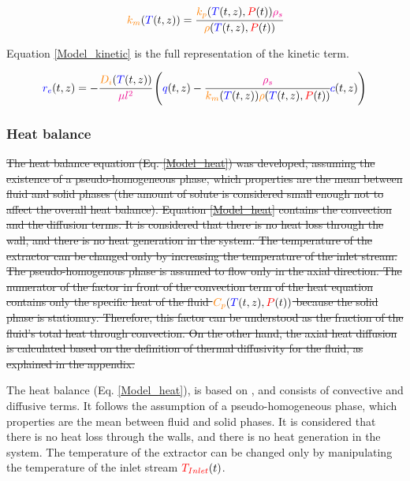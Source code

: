 \documentclass[../Parameter_fitting.tex]{subfiles}
\begin{document}
			{\footnotesize
				\begin{align}
					{\color{orange}k_m}({\color{blue}T}(t,z)) = \cfrac{{\color{orange}k_p}({\color{blue}T}(t,z),{\color{red}P}(t)) {\color{magenta}\rho_s}}{{\color{orange}\rho}({\color{blue}T}(t,z),{\color{red}P}(t))}
			\end{align} }
			
			Equation \ref{Model_kinetic} is the full representation of the kinetic term.
			
			{\footnotesize
				\begin{align}
					\label{Model_kinetic}
					{\color{blue}r_e}(t,z) = -\cfrac{{\color{orange}D_i}({\color{blue}T}(t,z))}{{\color{magenta} \mu l^2} }\left({\color{blue}q}(t,z) - \cfrac{{\color{magenta}\rho_s}}{{\color{orange}k_m}({\color{blue}T}(t,z)){\color{orange}\rho}({\color{blue}T}(t,z),{\color{red}P}(t))}  {\color{blue}c}(t,z) \right)
			\end{align} }
			
			\subsubsection{Heat balance} \label{CH: heat_balance}
			\sout{The heat balance equation (Eq.  \ref{Model_heat}) was developed, assuming the existence of a pseudo-homogeneous phase, which properties are the mean between fluid and solid phases (the amount of solute is considered small enough not to affect the overall heat balance). Equation \ref{Model_heat} contains the convection and the diffusion terms. It is considered that there is no heat loss through the wall, and there is no heat generation in the system. The temperature of the extractor can be changed only by increasing the temperature of the inlet stream. The pseudo-homogenous phase is assumed to flow only in the axial direction. 
			The numerator of the factor in front of the convection term of the heat equation contains only the specific heat of the fluid ${\color{orange}C_p}({\color{blue}T}(t,z),{\color{red}P}(t))$ because the solid phase is stationary. Therefore, this factor can be understood as the fraction of the fluid's total heat through convection. On the other hand, the axial heat diffusion is calculated based on the definition of thermal diffusivity for the fluid, as explained in the appendix. }
			
			{\color{blue} The heat balance (Eq. \ref{Model_heat}), is based on \citet{Srinivasan2012}, and consists of convective and diffusive terms. It follows the assumption of a pseudo-homogeneous phase, which properties are the mean between fluid and solid phases. It is considered that there is no heat loss through the walls, and there is no heat generation in the system. The temperature of the extractor can be changed only by manipulating the temperature of the inlet stream ${\color{red}T_{Inlet}}(t)$.
			}
			
\end{document}
